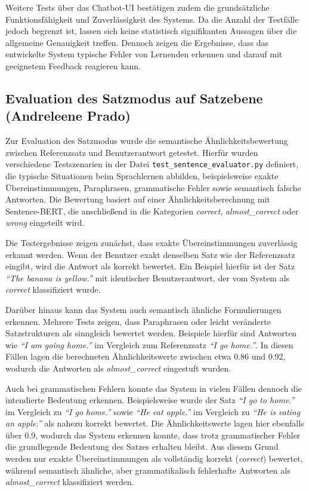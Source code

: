 Weitere Tests über das Chatbot-UI bestätigen zudem die grundsätzliche Funktionsfähigkeit und Zuverlässigkeit des Systems.
Da die Anzahl der Testfälle jedoch begrenzt ist, lassen sich keine statistisch signifikanten Aussagen über die allgemeine Genauigkeit treffen. Dennoch zeigen die Ergebnisse, dass das entwickelte System typische Fehler von Lernenden erkennen und darauf mit geeignetem Feedback reagieren kann.

\subsection{Evaluation des Satzmodus auf Satzebene (Andreleene Prado)}
Zur Evaluation des Satzmodus wurde die semantische Ähnlichkeitsbewertung zwischen Referenzsatz und Benutzerantwort getestet. 
Hierfür wurden verschiedene Testszenarien in der Datei \texttt{test\_sentence\_evaluator.py} definiert, die typische Situationen beim Sprachlernen abbilden, beispielsweise exakte Übereinstimmungen, Paraphrasen, grammatische Fehler sowie semantisch falsche Antworten. 
Die Bewertung basiert auf einer Ähnlichkeitsberechnung mit Sentence-BERT, die anschließend in die Kategorien \textit{correct}, \textit{almost\_correct} oder \textit{wrong} eingeteilt wird.

Die Testergebnisse zeigen zunächst, dass exakte Übereinstimmungen zuverlässig erkannt werden. 
Wenn der Benutzer exakt denselben Satz wie der Referenzsatz eingibt, wird die Antwort als korrekt bewertet. 
Ein Beispiel hierfür ist der Satz \textit{\enquote{The banana is yellow.}} mit identischer Benutzerantwort, der vom System als \textit{correct} klassifiziert wurde.

Darüber hinaus kann das System auch semantisch ähnliche Formulierungen erkennen. 
Mehrere Tests zeigen, dass Paraphrasen oder leicht veränderte Satzstrukturen als sinngleich bewertet werden. 
Beispiele hierfür sind Antworten wie \textit{\enquote{I am going home.}} im Vergleich zum Referenzsatz \textit{\enquote{I go home.}}.
In diesen Fällen lagen die berechneten Ähnlichkeitswerte zwischen etwa 0.86 und 0.92, wodurch die Antworten als \textit{almost\_correct} eingestuft wurden.

Auch bei grammatischen Fehlern konnte das System in vielen Fällen dennoch die intendierte Bedeutung erkennen. 
Beispielsweise wurde der Satz \textit{\enquote{I go to home.}} im Vergleich zu \textit{\enquote{I go home.}} sowie \textit{\enquote{He eat apple.}} im Vergleich zu \textit{\enquote{He is eating an apple.}} als nahezu korrekt bewertet. 
Die Ähnlichkeitswerte lagen hier ebenfalls über 0.9, wodurch das System erkennen konnte, dass trotz grammatischer Fehler die grundlegende Bedeutung des Satzes erhalten bleibt. 
Aus diesem Grund werden nur exakte Übereinstimmungen als vollständig korrekt (\textit{correct}) bewertet, während semantisch ähnliche, aber grammatikalisch fehlerhafte Antworten als \textit{almost\_correct} klassifiziert werden.

